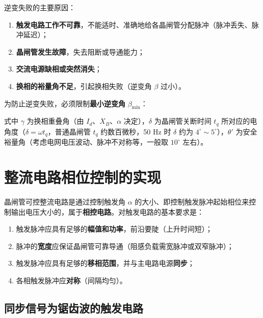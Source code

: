 逆变失败的主要原因：

\begin{enumerate}
  \item \textbf{触发电路工作不可靠}，不能适时、准确地给各晶闸管分配脉冲（脉冲丢失、脉冲延迟）；
  \item \textbf{晶闸管发生故障}，失去阻断或导通能力；
  \item \textbf{交流电源缺相或突然消失}；
  \item \textbf{换相的裕量角不足}，引起换相失败（逆变角 $\beta$ 过小）。
\end{enumerate}

为防止逆变失败，必须限制\textbf{最小逆变角} $\beta_{\min}$：


式中 $\gamma$ 为换相重叠角（由 $I_d$、$X_B$、$\alpha$ 决定），$\delta$ 为晶闸管关断时间 $t_q$ 所对应的电角度（$\delta=\omega t_q$，普通晶闸管 $t_q$ 约数百微秒，50 Hz 时 $\delta$ 约为 $4^\circ\sim5^\circ$），$\theta'$ 为安全裕量角（考虑电网电压波动、脉冲不对称等，一般取 $10^\circ$ 左右）。


\section{整流电路相位控制的实现}

晶闸管可控整流电路是通过控制触发角 $\alpha$ 的大小、即控制触发脉冲起始相位来控制输出电压大小的，属于\textbf{相控电路}。对触发电路的基本要求是：

\begin{enumerate}
  \item 触发脉冲应具有足够的\textbf{幅值和功率}，前沿要陡（上升时间短）；
  \item 脉冲的\textbf{宽度}应保证晶闸管可靠导通（阻感负载需宽脉冲或双窄脉冲）；
  \item 触发脉冲应具有足够的\textbf{移相范围}，并与主电路电源\textbf{同步}；
  \item 各相触发脉冲应\textbf{对称}（间隔均匀）。
\end{enumerate}

\subsection{同步信号为锯齿波的触发电路}

